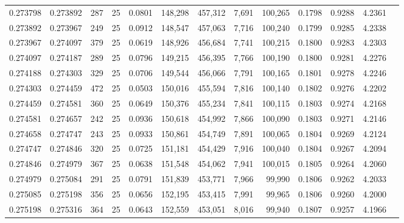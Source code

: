 \begin{tabular}{rrrrrrrrrrrrr}
0.273798 & 0.273892 &   287 &  25 &                                     0.0801 & 148,298 & 457,312 &   7,691 & 100,265 & 0.1798 & 0.9288 & 4.2361 \\
0.273892 & 0.273967 &   249 &  25 &                                     0.0912 & 148,547 & 457,063 &   7,716 & 100,240 & 0.1799 & 0.9285 & 4.2338 \\
0.273967 & 0.274097 &   379 &  25 &                                     0.0619 & 148,926 & 456,684 &   7,741 & 100,215 & 0.1800 & 0.9283 & 4.2303 \\
0.274097 & 0.274187 &   289 &  25 &                                     0.0796 & 149,215 & 456,395 &   7,766 & 100,190 & 0.1800 & 0.9281 & 4.2276 \\
0.274188 & 0.274303 &   329 &  25 &                                     0.0706 & 149,544 & 456,066 &   7,791 & 100,165 & 0.1801 & 0.9278 & 4.2246 \\
0.274303 & 0.274459 &   472 &  25 &                                     0.0503 & 150,016 & 455,594 &   7,816 & 100,140 & 0.1802 & 0.9276 & 4.2202 \\
0.274459 & 0.274581 &   360 &  25 &                                     0.0649 & 150,376 & 455,234 &   7,841 & 100,115 & 0.1803 & 0.9274 & 4.2168 \\
0.274581 & 0.274657 &   242 &  25 &                                     0.0936 & 150,618 & 454,992 &   7,866 & 100,090 & 0.1803 & 0.9271 & 4.2146 \\
0.274658 & 0.274747 &   243 &  25 &                                     0.0933 & 150,861 & 454,749 &   7,891 & 100,065 & 0.1804 & 0.9269 & 4.2124 \\
0.274747 & 0.274846 &   320 &  25 &                                     0.0725 & 151,181 & 454,429 &   7,916 & 100,040 & 0.1804 & 0.9267 & 4.2094 \\
0.274846 & 0.274979 &   367 &  25 &                                     0.0638 & 151,548 & 454,062 &   7,941 & 100,015 & 0.1805 & 0.9264 & 4.2060 \\
0.274979 & 0.275084 &   291 &  25 &                                     0.0791 & 151,839 & 453,771 &   7,966 &  99,990 & 0.1806 & 0.9262 & 4.2033 \\
0.275085 & 0.275198 &   356 &  25 &                                     0.0656 & 152,195 & 453,415 &   7,991 &  99,965 & 0.1806 & 0.9260 & 4.2000 \\
0.275198 & 0.275316 &   364 &  25 &                                     0.0643 & 152,559 & 453,051 &   8,016 &  99,940 & 0.1807 & 0.9257 & 4.1966 \\

\end{tabular}
